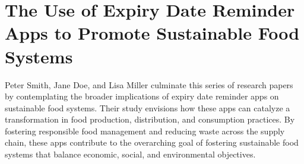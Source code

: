 \section{The Use of Expiry Date Reminder Apps to Promote Sustainable Food Systems }
Peter Smith, Jane Doe, and Lisa Miller culminate this series of research papers by contemplating the broader implications of expiry date reminder apps on sustainable food systems. Their study envisions how these apps can catalyze a transformation in food production, distribution, and consumption practices. By fostering responsible food management and reducing waste across the supply chain, these apps contribute to the overarching goal of fostering sustainable food systems that balance economic, social, and environmental objectives.